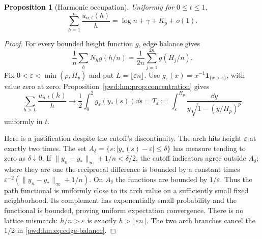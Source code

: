 \documentclass[11pt,letterpaper]{article}
\numberwithin{equation}{section}
\newtheorem{proposition}[theorem]{Proposition}
\theoremstyle{remark}\newtheorem{remark}[theorem]{Remark}
\begin{document}
\begin{proposition}[Harmonic occupation]\label{pwd:hm:prop:harmonic-occupation}
Uniformly for $0\le t\le1$,
\begin{equation}\label{pwd:hm:eq:harmonic-occupation}
 \sum_{h=1}^n\frac{u_{n,t}(h)}h
 =\log n+\gamma+K_p+o(1).
\end{equation}
\end{proposition}
\begin{proof}
For every bounded height function $g$, edge balance gives
\begin{equation}\label{pwd:hm:eq:edge-balance}
 \frac1n\sum_hN_hg(h/n)=\frac1{2n}\sum_{j=1}^{2n}g(H_j/n).
\end{equation}
Fix $0<\varepsilon<\min(\rho,H_p)$ and put $L=\lfloor\varepsilon n\rfloor$. Use
$g_\varepsilon(x)=x^{-1}\mathbf1_{\{x>\varepsilon\}}$, with value zero at zero. Proposition~\ref{pwd:hm:prop:concentration} gives
\begin{equation}\label{pwd:hm:eq:bulk-harmonic}
 \sum_{h>L}\frac{u_{n,t}(h)}h\longrightarrow
 \frac12\int_0^2g_\varepsilon(y_*(s))\dd s
 =T_\varepsilon:=\int_\varepsilon^{H_p}\frac{\dd y}{y\sqrt{1-(y/H_p)^p}}
\end{equation}
uniformly in $t$.

Here is a justification despite the cutoff's discontinuity. The arch hits height $\varepsilon$ at exactly two times. The set
$A_\delta=\{s:|y_*(s)-\varepsilon|\le\delta\}$ has measure tending to zero as $\delta\downarrow0$. If $\|y_n-y_*\|_\infty+1/n<\delta/2$, the cutoff indicators agree outside $A_\delta$; where they are one the reciprocal difference is bounded by a constant times $\varepsilon^{-2}(\|y_n-y_*\|_\infty+1/n)$. On $A_\delta$ the functions are bounded by $1/\varepsilon$. Thus the path functional is uniformly close to its arch value on a sufficiently small fixed neighborhood. Its complement has exponentially small probability and the functional is bounded, proving uniform expectation convergence. There is no lattice mismatch: $h/n>\varepsilon$ is exactly $h>\lfloor\varepsilon n\rfloor$. The two arch branches cancel the $1/2$ in \eqref{pwd:hm:eq:edge-balance}.


\end{proof}
\end{document}
